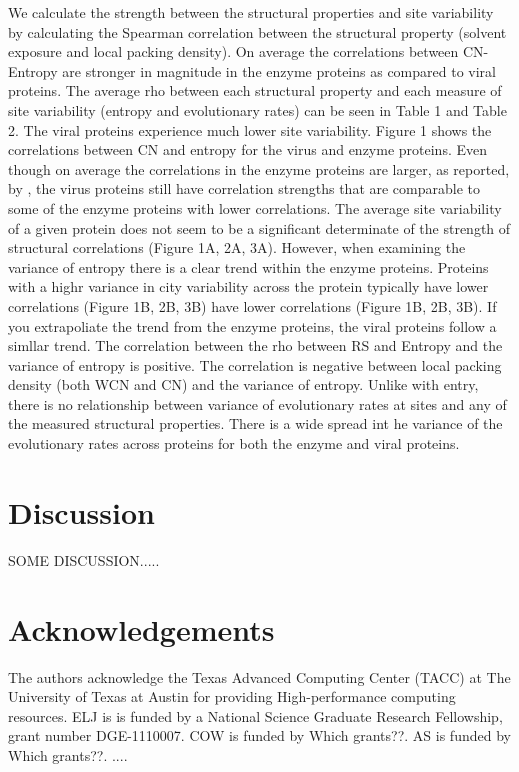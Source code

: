 \documentclass[12pt]{article}
\begin{document}
We calculate the strength between the structural properties and site variability by calculating the Spearman correlation between the structural property (solvent exposure and local packing density). On average the correlations between CN-Entropy are stronger in magnitude in the enzyme proteins as compared to viral proteins. The average rho between each structural property and each measure of site variability (entropy and evolutionary rates) can be seen in Table 1 and Table 2. The viral proteins experience much lower site variability. Figure 1 shows the correlations between CN and entropy for the virus and enzyme proteins. Even though on average the correlations in the enzyme proteins are larger, as reported, by \cite{Yehetal2014}, the virus proteins still have correlation strengths that are comparable to some of the enzyme proteins with lower correlations. The average site variability of a given protein does not seem to be a significant determinate of the strength of structural correlations (Figure 1A, 2A, 3A). However, when examining the variance of entropy there is a clear trend within the enzyme proteins. Proteins with a highr variance in city variability across the protein typically have lower correlations (Figure 1B, 2B, 3B) have lower correlations (Figure 1B, 2B, 3B). If you extrapoliate the trend from the enzyme proteins, the viral proteins follow a simllar trend. The correlation between the rho between RS and Entropy and the variance of entropy is positive. The correlation is negative between local packing density (both WCN and CN) and the variance of entropy. Unlike with entry, there is no relationship between variance of evolutionary rates at sites and any of the measured structural properties. There is a wide spread int he variance of the evolutionary rates across proteins for both the enzyme and viral proteins. 


\section{Discussion}
\label{sec:dcr}
{\color{red}SOME DISCUSSION.....} \\


\section{Acknowledgements}
The authors acknowledge the Texas Advanced Computing Center (TACC) at The University of Texas at Austin for providing High-performance computing resources. ELJ is is funded by a National Science Graduate Research Fellowship, grant number DGE-1110007. COW is funded by {\color{red} Which grants??}.  AS is funded by {\color{red} Which grants??}.
....
\end{document}
